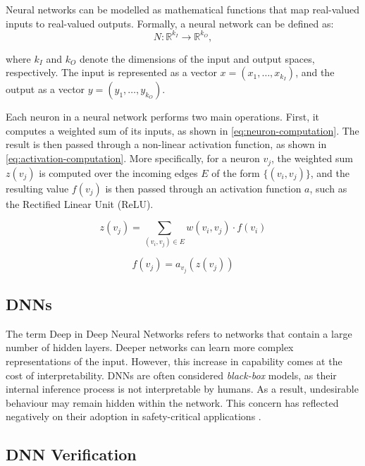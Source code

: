 

Neural networks can be modelled as mathematical functions that map real-valued inputs to real-valued outputs. Formally, a neural network can be defined as:
\[
N : \mathbb{R}^{k_I} \rightarrow \mathbb{R}^{k_O},
\]

where $k_I$ and $k_O$ denote the dimensions of the input and output spaces, respectively. The input is represented as a vector $x = (x_1, \ldots, x_{k_I})$, and the output as a vector $y = (y_1, \ldots, y_{k_O})$.

Each neuron in a neural network performs two main operations. First, it computes a weighted sum of its inputs, as shown in \autoref{eq:neuron-computation}. The result is then passed through a non-linear activation function, as shown in \autoref{eq:activation-computation}. More specifically, for a neuron $v_j$, the weighted sum $z(v_j)$ is computed over the incoming edges $E$ of the form $\{(v_i, v_j)\}$, and the resulting value $f(v_j)$ is then passed through an activation function $a$, such as the Rectified Linear Unit (ReLU).

\begin{equation}
z(v_j) = \sum_{(v_i, v_j) \in E} w(v_i, v_j) \cdot f(v_i)
\label{eq:neuron-computation}
\end{equation}

\begin{equation}
f(v_j) = a_{v_j}(z(v_j))
\label{eq:activation-computation}
\end{equation}



\subsection{DNNs}

The term Deep in Deep Neural Networks refers to networks that contain a large number of hidden layers. Deeper networks can learn more complex representations of the input. However, this increase in capability comes at the cost of interpretability. DNNs are often considered \textit{black-box} models, as their internal inference process is not interpretable by humans. As a result, undesirable behaviour may remain hidden within the network. This concern has reflected negatively on their adoption in safety-critical applications \cite{interpretable_machine_learning}.

\subsection{DNN Verification}

